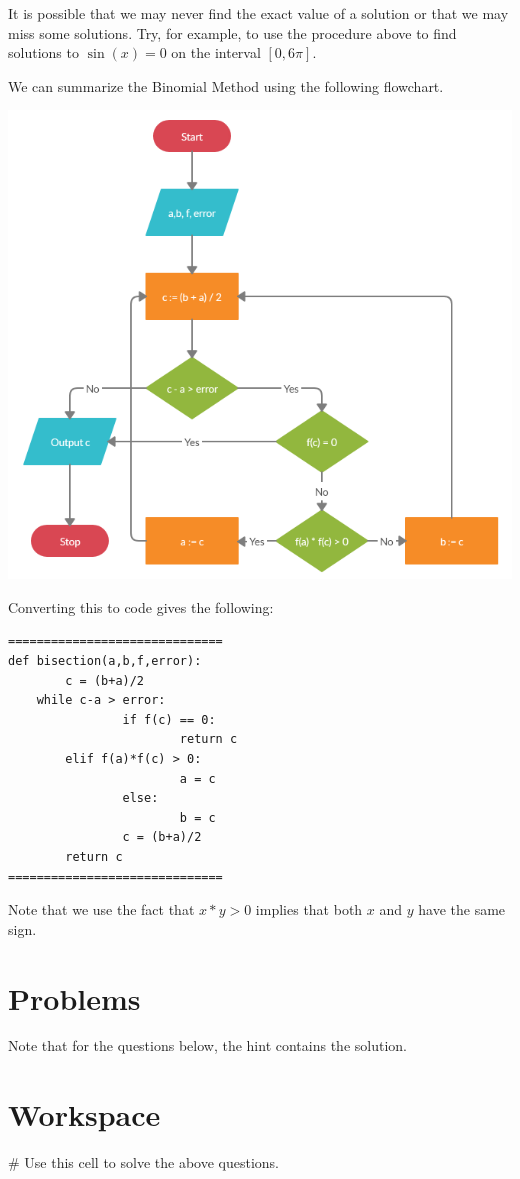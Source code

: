 \documentclass{ximera}
\begin{document}
It is possible that we may never find the exact value of a solution or that we may miss some solutions. Try, for example, to use the procedure above to find solutions to $\sin(x)=0$ on the interval $[0,6\pi]$.

We can summarize the Binomial Method using the following flowchart.

\begin{center}
	\includegraphics{bisection.png}
\end{center}

Converting this to code gives the following:

\begin{verbatim}
==============================
def bisection(a,b,f,error):
        c = (b+a)/2
	while c-a > error:
                if f(c) == 0:
                        return c
		elif f(a)*f(c) > 0:
                        a = c
                else:
                        b = c
                c = (b+a)/2
        return c
==============================
\end{verbatim}

Note that we use the fact that $x*y>0$ implies that both $x$ and $y$ have the same sign.

\section{Problems}

Note that for the questions below, the hint contains the solution.

\begin{question}
\end{question}

\section{Workspace}

\begin{sageCell}
# Use this cell to solve the above questions.
\end{sageCell}
\end{document}
